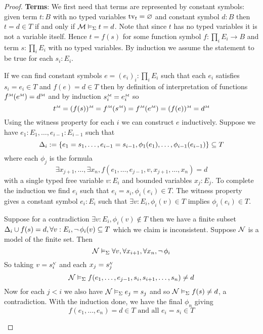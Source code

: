 \begin{proof}
    \textbf{Terms}: We first need that terms are represented 
    by constant symbols: 
    given term $t : B$ with no typed variables $\textrm{tv}_{t} = \varnothing$
    and constant symbol
    $d : B$ then $t = d \in T$ 
    if and only if $\mathcal{M} \vDash_{\Sigma} t = d$.
    Note that since $t$ has no typed variables it is not a variable itself.
    Hence $t = f(s)$ for some function symbol 
    $f : \prod_i E_i \to B$ and term $s : \prod_i E_i$ with no typed variables.
    By induction we assume the statement to be true for each $s_i : E_i$.

        \begin{forward} 
            If we can find constant symbols
            $e = (e_i)_i : \prod_i E_i$ 
            such that each $e_i$ satisfies
            $s_i = e_i \in T$
            and $f(e) = d \in T$
            then by definition 
            of interpretation of functions 
            $\mmintp{f}(\mmintp{e}) = \mmintp{d}$
            and by induction 
            $\mmintp{s_i}
            = \mmintp{e_i}$ so
            \[
                \mmintp{t} = \mmintp{(f(s))}
                = \mmintp{f}(\mmintp{s})
                = \mmintp{f}(\mmintp{e})
                = \mmintp{(f(e))} 
                = \mmintp{d}
            \]
            Using the witness property for each $i$ 
            we can construct $e$ inductively.
            Suppose we have $e_1 : E_1,\dots, e_{i-1} : E_{i-1}$ 
            such that 
            \[  
                \Delta_i := \left\{e_1 = s_1, \dots, e_{i-1} = s_{i-1},
                \phi_1(e_1),\dots,\phi_{i-1}(e_{i-1})\right\} \subseteq T
            \]
            where each $\phi_j$ is the formula
            \[
                \exists x_{j+1}, \dots, \exists x_{n}, 
                f(e_1, \dots, e_{j-1},v,x_{j+1},\dots, x_{n}) = d
            \]
            with a single typed free variable $v : E_i$ and bounded variables 
            $x_j : E_j$.
            To complete the induction we find $e_i$ such that 
            $e_i = s_i, \phi_i(e_i) \in T$.
            The witness property gives a constant symbol 
            $e_i : E_i$ such that $\exists v : E_i, \phi_i(v) \in T$ 
            implies $\phi_i(e_i) \in T$.
            
            Suppose for a contradiction $\exists v : E_i, \phi_i(v) \notin T$
            then we have a finite subset
            $\Delta_i \cup {f(s) = d, \forall v : E_i, \neg\,\phi_i(v)} \subseteq T$
            which we claim is inconsistent.
            Suppose $\mathcal{N}$ is a model of the finite set.
            Then 
            \[
                \mathcal{N} \vDash_{\Sigma} \forall v, \forall x_{i+1}, \forall x_{n}, 
                \neg\, \phi_i
            \]
            So taking $v = \nnintp{s_i}$ and each $x_j = \nnintp{s_j}$
            \[
                \mathcal{N} \vDash_{\Sigma} 
                f(e_1, \dots, e_{j-1},s_i,s_{i+1},\dots, s_{n}) \ne d
            \]
            Now for each $j < i$ we also have $\mathcal{N} \vDash_{\Sigma} e_j = s_j$ and so 
            $\mathcal{N} \vDash_{\Sigma} f(s) \ne d$, a contradiction.
            With the induction done, we have the final $\phi_n$ giving 
            \[f(e_1, \dots, e_{n}) = d \in T \text{ and all } e_i = s_i \in T\]
        \end{forward}


\end{proof}
